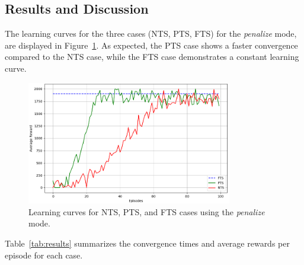 \documentclass[runningheads]{llncs}
\theoremstyle{freethm}
\theoremstyle{proofoutline}
\begin{document}
\subsection{Results and Discussion}

The learning curves for the three cases (NTS, PTS, FTS) for the \textit{penalize} mode, are displayed in Figure~\ref{fig:learning_curves}. As expected, the PTS case shows a faster convergence compared to the NTS case, while the FTS case demonstrates a constant learning curve.

\begin{figure}[h!]
    \centering
    \includegraphics[width=0.8\textwidth]{figures/penalize_learning_curves.png}
    \caption{Learning curves for NTS, PTS, and FTS cases using the \textit{penalize} mode.}
    \label{fig:learning_curves}
\end{figure}

Table~\ref{tab:results} summarizes the convergence times and average rewards per episode for each case.
\end{document}
